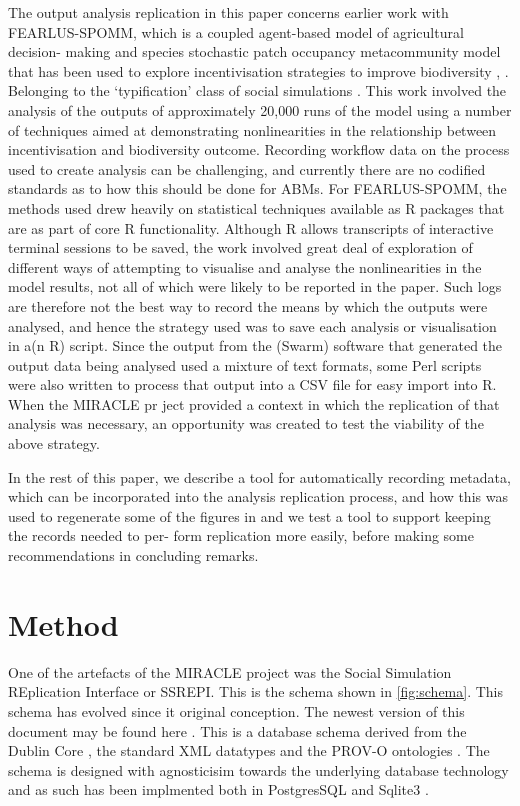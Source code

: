 \documentclass[runningheads]{llncs}
\begin{document}
The output analysis replication in this paper concerns earlier work with
FEARLUS-SPOMM, which is a coupled agent-based model of agricultural decision-
making and species stochastic patch occupancy metacommunity model that has been
used to explore incentivisation strategies to improve biodiversity
\cite{polhill_nonlinearities_2013}, \cite{gimona2011exploring}. Belonging to the
‘typification’ class of social simulations  \cite{boero2005does}.  This work
involved the analysis of the outputs of approximately 20,000 runs of the model
using a number of techniques aimed at demonstrating nonlinearities in the
relationship between incentivisation and biodiversity outcome.  Recording
workflow data on the process used to create analysis can be challenging, and
currently there are no codified standards as to how this should be done for
ABMs. For FEARLUS-SPOMM, the methods used drew heavily on statistical
techniques available as R packages that are as part of core R functionality.
Although R allows transcripts of interactive terminal sessions to be saved, the
work involved great deal of exploration of different ways of attempting to
visualise and analyse the nonlinearities in the model results, not all of
which were likely to be reported in the paper. Such logs are therefore not the
best way to record the means by which the outputs were analysed, and hence the
strategy used was to save each analysis or visualisation in a(n R) script.
Since the output from the (Swarm) software that generated the output data being
analysed used a mixture of text formats, some Perl scripts were also written to
process that output into a CSV file for easy import into R. When the MIRACLE pr
ject \cite{parker2019final} provided a context in which the replication of that
analysis was necessary, an opportunity was created to test the viability of the
above strategy.

In the rest of this paper, we describe  a tool for automatically recording
metadata, which can be incorporated into the analysis replication process, and
how this  was used to regenerate some of the figures in
\cite{polhill_nonlinearities_2013} and we test a tool to support keeping the
records needed to per- form replication more easily, before making some
recommendations in concluding remarks.

\section{Method}

One of the artefacts of the MIRACLE project \cite{parker2019final} was the
Social Simulation REplication Interface or SSREPI. This is the schema shown in
\ref{fig:schema}.  This schema has evolved since it original conception.  The
newest version of this document may be found here \cite{polhill2022miracle}. This is a database
schema derived from the Dublin Core \cite{weibel2000dublin}, the standard XML
datatypes \cite{biron2004xml} and the PROV-O ontologies \cite{missier2013w3c}.
The schema is designed with agnosticisim towards the underlying database
technology and as such has been implmented both in PostgresSQL
\cite{stonebraker1991postgres} and Sqlite3 \cite{sqliteorg2023syntax}.
\end{document}
